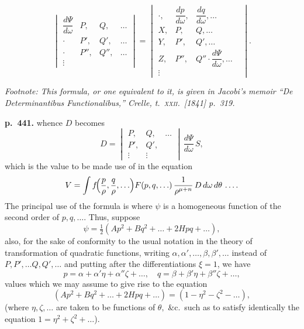 \documentclass[11pt]{article}
\begin{document}
\[ \begin{vmatrix} \dfrac{d\Psi}{d\omega} & P, & Q, & \ldots \\[4pt] \cdot & P', & Q', & \ldots \\[2pt] \cdot & P'', & Q'', & \ldots \\ \vdots & & & \end{vmatrix} = \begin{vmatrix} \cdot,&\dfrac{dp}{d\omega},&\dfrac{dq}{d\omega},\ldots\\[6pt] X,&P,&Q,\ldots\\[2pt] Y,&P',&Q',\ldots\\[2pt] Z,&P'',&Q''\cdot\dfrac{d\Psi}{d\omega},\ldots\\ \vdots&&& \end{vmatrix}. \]

\noindent\textit{Footnote: This formula, or one equivalent to it, is given in Jacobi's memoir ``De Determinantibus Functionalibus,'' \textit{Crelle}, t.~\textsc{xxii}.\ [1841] p.~319.}

\bigskip
\noindent\textbf{p.~441.} whence $D$ becomes
\[ D = \begin{vmatrix} P,&Q,&\ldots\\[2pt] P',&Q',&\\ \vdots&\vdots& \end{vmatrix}\,\frac{d\Psi}{d\omega}\,S, \]
which is the value to be made use of in the equation
\[ V = \int f\!\Bigl(\frac{p}{\rho},\frac{q}{\rho},\ldots\Bigr)F(p, q, \ldots)\,\frac{1}{\rho^{\mu + n}}\,D\,d\omega\,d\theta\,\ldots. \]
The principal use of the formula is where $\psi$ is a homogeneous function of the second order of $p, q, \ldots$. Thus, suppose
\[ \psi = \tfrac{1}{2}(Ap^2 + Bq^2 + \ldots + 2Hpq + \ldots), \]
also, for the sake of conformity to the usual notation in the theory of transformation of quadratic functions, writing $\alpha, \alpha', \ldots, \beta, \beta', \ldots$ instead of $P, P', \ldots Q, Q', \ldots$ and putting after the differentiations $\xi = 1$, we have
\[ p = \alpha + \alpha'\eta + \alpha''\zeta + \ldots,\quad q = \beta + \beta'\eta + \beta''\zeta + \ldots, \]
values which we may assume to give rise to the equation
\[ (Ap^2 + Bq^2 + \ldots + 2Hpq + \ldots) = (1 - \eta^2 - \zeta^2 - \ldots), \]
(where $\eta, \zeta, \ldots$ are taken to be functions of $\theta,$ \&c.\ such as to satisfy identically the equation $1 = \eta^2 + \zeta^2 + \ldots$).
\end{document}
